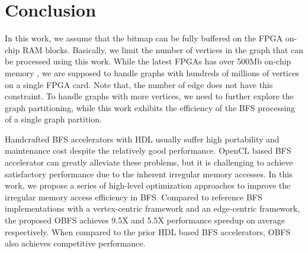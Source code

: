 \section{Conclusion} \label{sec:conclusion}

In this work, we assume that the bitmap can be fully buffered on 
the FPGA on-chip RAM blocks. 
Basically, we limit the number of vertices in the graph that 
can be processed using this work. While the latest FPGAs has over 
500Mb on-chip memory \cite{xilinxFPGA}, we are supposed to handle graphs with hundreds 
of millions of vertices on a single FPGA card. Note that, the number of edge does 
not have this constraint. To handle graphs with more vertices, we need to further explore 
the graph partitioning, while this work exhibits 
the efficiency of the BFS processing of a single graph partition.

Handcrafted BFS accelerators with HDL usually suffer high portability and maintenance cost despite the relatively 
good performance. OpenCL based BFS accelerator can greatly alleviate these problems, but it is 
challenging to achieve satisfactory performance due to the inherent irregular memory accesses. 
In this work, we propose a series of high-level optimization approaches to improve the irregular 
memory access efficiency in BFS. Compared to reference BFS implementations with a vertex-centric 
framework and an edge-centric framework, 
the proposed OBFS achieves 9.5X and 5.5X performance speedup on average respectively. 
When compared to the prior HDL based BFS accelerators, OBFS also achieves competitive 
performance.


